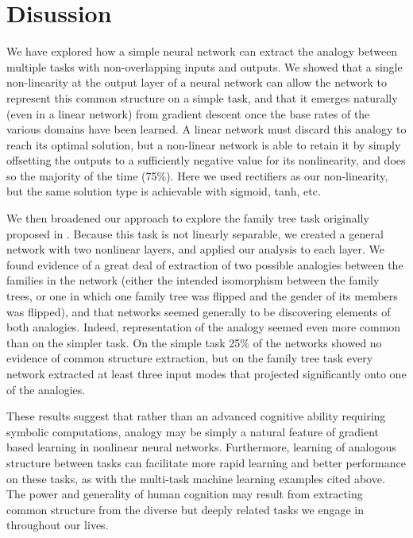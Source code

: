 \documentclass[10pt,letterpaper]{article}
\begin{document}
\section{Disussion}
We have explored how a simple neural network can extract the analogy between multiple tasks with non-overlapping inputs and outputs. We showed that a single non-linearity at the output layer of a neural network can allow the network to represent this common structure on a simple task, and that it emerges naturally (even in a linear network) from gradient descent once the base rates of the various domains have been learned. A linear network must discard this analogy to reach its optimal solution, but a non-linear network is able to retain it by simply offsetting the outputs to a sufficiently negative value for its nonlinearity, and does so the majority of the time (75\%). Here we used rectifiers as our non-linearity, but the same solution type is achievable with sigmoid, tanh, etc. \par 
We then broadened our approach to explore the family tree task originally proposed in \citet{Hinton1986}. Because this task is not linearly separable, we created a general network with two nonlinear layers, and applied our analysis to each layer. We found evidence of a great deal of extraction of two possible analogies between the families in the network (either the intended isomorphism between the family trees, or one in which one family tree was flipped and the gender of its members was flipped), and that networks seemed generally to be discovering elements of both analogies. Indeed, representation of the analogy seemed even more common than on the simpler task. On the simple task 25\% of the networks showed no evidence of common structure extraction, but on the family tree task every network extracted at least three input modes that projected significantly onto one of the analogies. \par 
These results suggest that rather than an advanced cognitive ability requiring symbolic computations, analogy may be simply a natural feature of gradient based learning in nonlinear neural networks. Furthermore, learning of analogous structure between tasks can facilitate more rapid learning and better performance on these tasks, as with the multi-task machine learning examples cited above. The power and generality of human cognition may result from extracting common structure from the diverse but deeply related tasks we engage in throughout our lives. 
\end{document}
